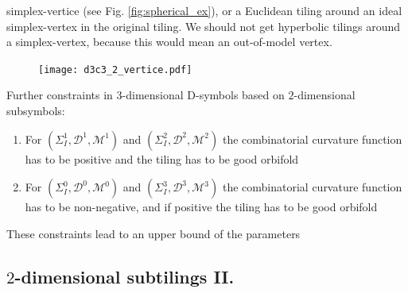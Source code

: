 \begin{frame}
\begin{itemize}
{	simplex-vertice (see Fig. \ref{fig:spherical_ex}), or a Euclidean tiling
	around an ideal simplex-vertex in the original tiling. We should not get
	hyperbolic tilings around a simplex-vertex, because this would mean an
	out-of-model vertex.}
    \end{itemize}
    \begin{figure}
      \center
      \texttt{[image: d3c3\_2\_vertice.pdf]}
    \end{figure}
\end{frame}

\begin{frame}
  Further constraints in $3$-dimensional D-symbols based on $2$-dimensional
  subsymbols:
  \begin{enumerate}
    \item For $(\Sigma_I^1,\mathcal{D}^1,\mathcal{M}^1)$ and
      $(\Sigma_I^2,\mathcal{D}^2,\mathcal{M}^2)$ the combinatorial curvature
      function has to be positive and the tiling has to be good
      orbifold
    \item For $(\Sigma_I^0,\mathcal{D}^0,\mathcal{M}^0)$ and
      $(\Sigma_I^3,\mathcal{D}^3,\mathcal{M}^3)$ the combinatorial curvature 
      function has to be non-negative, and if positive the tiling has to be good
      orbifold
  \end{enumerate}
  These constraints lead to an upper bound of the parameters 
\end{frame}

\subsection{$2$-dimensional subtilings II.}

